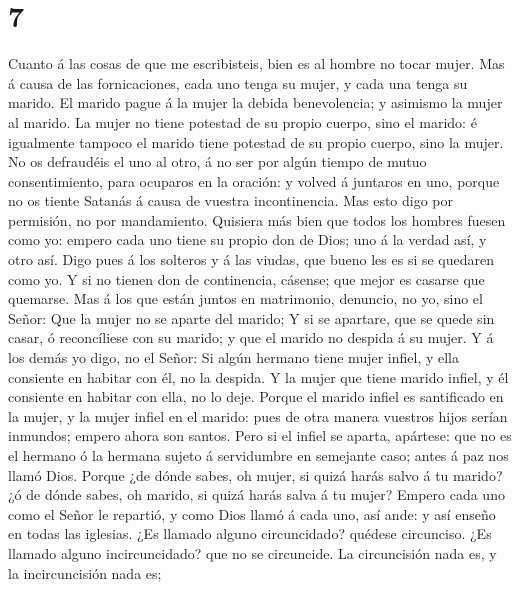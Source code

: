 \hypertarget{section-6}{%
\section{7}\label{section-6}}

 Cuanto á las cosas de que me escribisteis, bien es al
hombre no tocar mujer.  Mas á causa de las fornicaciones,
cada uno tenga su mujer, y cada una tenga su marido.  El
marido pague á la mujer la debida benevolencia; y asimismo la mujer al
marido.  La mujer no tiene potestad de su propio cuerpo,
sino el marido: é igualmente tampoco el marido tiene potestad de su
propio cuerpo, sino la mujer.  No os defraudéis el uno al
otro, á no ser por algún tiempo de mutuo consentimiento, para ocuparos
en la oración: y volved á juntaros en uno, porque no os tiente Satanás á
causa de vuestra incontinencia.  Mas esto digo por
permisión, no por mandamiento.  Quisiera más bien que
todos los hombres fuesen como yo: empero cada uno tiene su propio don de
Dios; uno á la verdad así, y otro así.  Digo pues á los
solteros y á las viudas, que bueno les es si se quedaren como yo.
 Y si no tienen don de continencia, cásense; que mejor es
casarse que quemarse.  Mas á los que están juntos en
matrimonio, denuncio, no yo, sino el Señor: Que la mujer no se aparte
del marido;  Y si se apartare, que se quede sin casar, ó
reconcíliese con su marido; y que el marido no despida á su mujer.
 Y á los demás yo digo, no el Señor: Si algún hermano
tiene mujer infiel, y ella consiente en habitar con él, no la despida.
 Y la mujer que tiene marido infiel, y él consiente en
habitar con ella, no lo deje.  Porque el marido infiel es
santificado en la mujer, y la mujer infiel en el marido: pues de otra
manera vuestros hijos serían inmundos; empero ahora son santos.
 Pero si el infiel se aparta, apártese: que no es el
hermano ó la hermana sujeto á servidumbre en semejante caso; antes á paz
nos llamó Dios.  Porque ¿de dónde sabes, oh mujer, si
quizá harás salvo á tu marido? ¿ó de dónde sabes, oh marido, si quizá
harás salva á tu mujer?  Empero cada uno como el Señor le
repartió, y como Dios llamó á cada uno, así ande: y así enseño en todas
las iglesias.  ¿Es llamado alguno circuncidado? quédese
circunciso. ¿Es llamado alguno incircuncidado? que no se circuncide.
 La circuncisión nada es, y la incircuncisión nada es;
